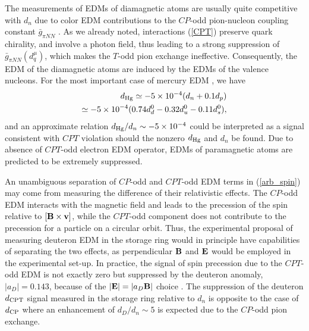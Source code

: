 \documentclass[prl,twocolumn,tightenlines,preprintnumbers,floatfix,nofootinbib]{revtex4}
\def\ba{\begin{eqnarray}}
\def\ea{\end{eqnarray}}
\begin{document}
The measurements of EDMs of diamagnetic atoms are usually 
quite competitive with $d_n$ due to 
color EDM contributions to the $CP$-odd pion-nucleon 
coupling constant $\bar g_{\pi NN}$ \cite{KL,PRann}. 
As we already noted, interactions (\ref{CPT}) preserve quark chirality, and 
involve a photon field, thus leading to a strong suppression of $\bar g_{\pi NN}(d^\mu_q)$, 
which makes the $T$-odd pion exchange ineffective. 
Consequently, the EDM of the diamagnetic atoms are induced by
the EDMs of the valence nucleons.
For the most important case of mercury EDM \cite{DS}, we have
\ba
d_{\rm Hg} \simeq - 5\times 10^{-4}(d_n + 0.1 d_p)\nonumber\\\simeq
-5\times 10^{-4}(0.74 d_d^0 -0.32 d_u^0 - 0.11 d_s^0),
\label{dHg}
\ea
and an approximate relation $d_{\rm Hg}/d_n \sim - 5\times 10^{-4}$ could be 
interpreted as a signal consistent with $CPT$ violation should the nonzero 
$d_{\rm Hg}$ and $d_n$ be found. Due to absence of $CPT$-odd electron 
EDM operator, EDMs of paramagnetic atoms are predicted to be extremely suppressed. 



An unambiguous separation of $CP$-odd and $CPT$-odd EDM terms in (\ref{arb_spin}) 
may come from measuring the difference of their relativistic effects. 
The $CP$-odd EDM interacts with the magnetic field 
and leads to the precession of the spin relative to $[{\bf B}\times{\bf v}]$, while the 
$CPT$-odd component does not contribute to the precession for a particle on a circular orbit. 
Thus, the experimental proposal of measuring deuteron EDM in the storage ring \cite{Deut} 
would in principle have capabilities of separating the two effects, as perpendicular ${\bf B}$  and ${\bf E}$ 
would be employed in the experimental set-up. In practice, the signal of  
spin precession due to the $ CPT $-odd EDM is not exactly zero but 
suppressed by the deuteron anomaly, $ |a_D| = 0.143$, 
because of the $|{\bf E}|=|a_D{\bf B}|$ choice \cite{Deut}. The suppression of the deuteron $d_{\rm CPT}$ signal 
measured in the storage ring relative to $d_n$ is opposite to the case of $ d_{\rm CP} $ where an
enhancement of $d_D/d_n \sim 5 $ is expected \cite{LOPR} due to the $CP$-odd pion exchange.
\end{document}
